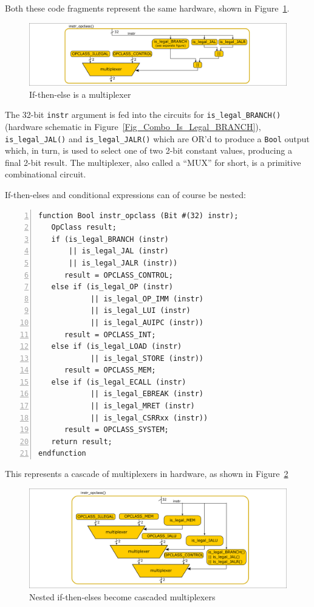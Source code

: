 Both these code fragments represent the same hardware, shown in
Figure~\ref{Fig_Combo_Multiplexer}.
\begin{figure}[htbp]
  \centerline{\includegraphics[width=6in,angle=0]{Figures/Fig_Combo_Multiplexer}}
  \caption{\label{Fig_Combo_Multiplexer}If-then-else is a multiplexer}
\end{figure}
The 32-bit \verb|instr| argument is fed into the circuits for
\verb|is_legal_BRANCH()| (hardware schematic in
Figure~\ref{Fig_Combo_Is_Legal_BRANCH}), \verb|is_legal_JAL()| and
\verb|is_legal_JALR()| which are OR'd to produce a \verb|Bool| output
which, in turn, is used to select one of two 2-bit constant values,
producing a final 2-bit result.  The multiplexer, also called a
``MUX'' for short, is a primitive combinational circuit.

If-then-elses and conditional expressions can of course be nested:


{\footnotesize
\begin{Verbatim}[frame=single, numbers=left]
function Bool instr_opclass (Bit #(32) instr);
   OpClass result;
   if (is_legal_BRANCH (instr)
       || is_legal_JAL (instr)
       || is_legal_JALR (instr))
      result = OPCLASS_CONTROL;
   else if (is_legal_OP (instr)
            || is_legal_OP_IMM (instr)
            || is_legal_LUI (instr)
            || is_legal_AUIPC (instr))
      result = OPCLASS_INT;
   else if (is_legal_LOAD (instr)
            || is_legal_STORE (instr))
      result = OPCLASS_MEM;
   else if (is_legal_ECALL (instr)
            || is_legal_EBREAK (instr)
            || is_legal_MRET (instr)
            || is_legal_CSRRxx (instr))
      result = OPCLASS_SYSTEM;
   return result;
endfunction
\end{Verbatim}
}

This represents a cascade of multiplexers in hardware, as shown in
Figure~\ref{Fig_Combo_Multiplexer_Cascade}
\begin{figure}[htbp]
  \centerline{\includegraphics[width=6in,angle=0]{Figures/Fig_Combo_Multiplexer_Cascade}}
  \caption{\label{Fig_Combo_Multiplexer_Cascade}Nested if-then-elses become cascaded multiplexers}
\end{figure}

